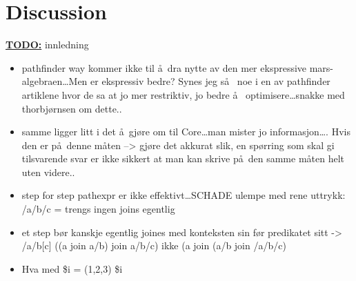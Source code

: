 \chapter{Discussion}
\label{chapter:discussion}

\textbf{\underline{\LARGE TODO:}} innledning

\begin{itemize}
  \item pathfinder way kommer ikke til \aa~dra nytte av den mer ekspressive
  mars-algebraen\ldots Men er ekspressiv bedre? Synes jeg s\aa~ noe i en av
  pathfinder artiklene hvor de sa at jo mer restriktiv, jo bedre \aa~
  optimisere\ldots snakke med thorbj\o rnsen om dette..
  \item samme ligger litt i det \aa~gj\o re om til Core\ldots man mister jo
  informasjon\ldots. Hvis den er p\aa~denne m\aa ten --> gj\o re det akkurat
  slik, en sp\o rring som skal gi tilsvarende svar er ikke sikkert at man kan
  skrive p\aa~den samme m\aa ten helt uten videre..
	\item step for step pathexpr er ikke effektivt\ldots SCHADE ulempe med rene
			uttrykk: /a/b/c = trengs ingen joins egentlig
	\item et step b\o r kanskje egentlig joines med konteksten sin f\o r predikatet
		sitt -> /a/b[c] ((a join a/b) join a/b/c) ikke (a join (a/b join /a/b/c)
	\item Hva med \$i = (1,2,3) \$i
\end{itemize}






